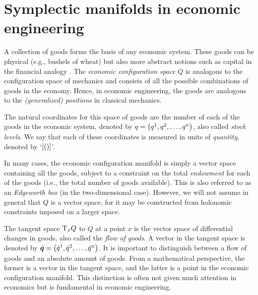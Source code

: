 \section{Symplectic manifolds in economic engineering}
\label{sec:symplectic_ee}
A collection of goods forms the basis of any economic system. These goods can be physical (e.g., bushels of wheat) but also more abstract notions such as capital in the financial analogy \cite{Kruimer2021}. The \emph{economic configuration space} \(Q\) is analogous to the configuration space of mechanics and consists of all the possible combinations of goods in the economy. 
Hence, in economic engineering, the goods are analogous to the \emph{(generalized) positions} in classical mechanics. 

The natural coordinates for this space of goods are the number of each of the goods in the economic system, denoted by \(q = \qty(q^1, q^2, \ldots, q^n)\), also called \emph{stock levels}. We say that each of these coordinates is measured in units of \emph{quantity}, denoted by `\(\qty[\si{\quantity}]\)'. 

In many cases, the economic configuration manifold is simply a vector space containing all the goods, subject to a constraint on the total \emph{endowment} for each of the goods (i.e., the total number of goods available). This is also referred to as an \emph{Edgeworth box} (in the two-dimensional case). However, we will not assume in general that $Q$ is a vector space, for it may be constructed from holonomic constraints imposed on a larger space.

The tangent space \(\mathrm{T}_{x} Q\) to \(Q\) at a point $x$ is the vector space of differential changes in goods, also called the \emph{flow of goods}. A vector in the tangent space is denoted by \(\vec{\dot{q}} = \qty(\dot{q}^1, \dot{q}^2, \ldots, \dot{q}^n)\). It is important to distinguish between a flow of goods and an absolute amount of goods. From a mathematical perspective, the former is a vector in the tangent space, and the latter is a point in the economic configuration manifold. This distinction is often not given much attention in economics but is fundamental in economic engineering.

